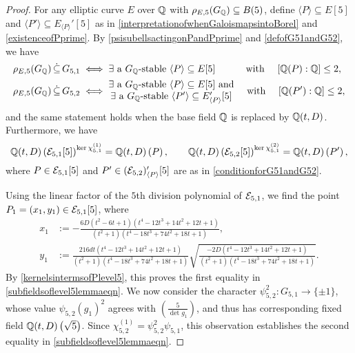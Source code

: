 \begin{proof}
For any elliptic curve $E$ over $\mathbb{Q}$ with $\rho_{E,5}(G_{\mathbb{Q}}) \subseteq B(5)$, define $\langle P \rangle \subseteq E[5]$ and $\langle P' \rangle \subseteq E_{\langle P \rangle}'[5]$ as in \eqref{interpretationofwhenGaloismapsintoBorel} and \eqref{existenceofPprime}.  By \eqref{psisubellsactingonPandPprime} and \eqref{defofG51andG52}, we have
\begin{equation} \label{conditionforG51andG52}
\begin{split}
\rho_{E,5}(G_{\mathbb{Q}}) \, \dot\subseteq \, G_{5,1} \; &\Longleftrightarrow \; \exists \text{ a $G_{\mathbb{Q}}$-stable } \langle P \rangle \subseteq E[5] \quad\quad\;\;\; \text{ with } \quad [ \mathbb{Q}( P ) : \mathbb{Q} ] \leq 2, \\
\rho_{E,5}(G_{\mathbb{Q}}) \, \dot\subseteq \, G_{5,2} \; &\Longleftrightarrow \; \begin{matrix} \exists \text{ a $G_{\mathbb{Q}}$-stable } \langle P \rangle \subseteq E[5] \text{ and} \\ \exists \text{ a $G_{\mathbb{Q}}$-stable  } \langle P' \rangle \subseteq E_{\langle P \rangle}' [5] \end{matrix} \quad \text{ with } \quad [ \mathbb{Q}( P' ) : \mathbb{Q} ] \leq 2,
\end{split}
\end{equation}
and the same statement holds when the base field $\mathbb{Q}$ is replaced by $\mathbb{Q}(t,D)$.  Furthermore, we have
\begin{equation} \label{kernelsintermsofPlevel5}
\mathbb{Q}(t,D)\left( \mathcal{E}_{5,1}[5] \right)^{\ker \chi_{5,1}^{(1)}} = \mathbb{Q}(t,D)\left( P \right), \quad\quad \mathbb{Q}(t,D)\left( \mathcal{E}_{5,2}[5] \right)^{\ker \chi_{5,1}^{(2)}} = \mathbb{Q}(t,D)\left( P' \right), 
\end{equation}
where $P \in \mathcal{E}_{5,1}[5]$ and $P' \in (\mathcal{E}_{5,2})_{\langle P \rangle}'[5]$ are as in \eqref{conditionforG51andG52}.

Using the linear factor of the $5$th division polynomial of $\mathcal{E}_{5,1}$, we find the point $P_1 = (x_1,y_1) \in \mathcal{E}_{5,1}[5]$, where
\[
\begin{split}
x_1 &:= -\frac{6D(t^2 - 6t + 1)(t^4 - 12t^3 + 14t^2 + 12t + 1)}{(t^2 + 1)(t^4 - 18t^3 + 74t^2 + 18t + 1)}, \\
y_1 &:=  \frac{216dt(t^4 - 12t^3 + 14t^2 + 12t + 1)}{(t^2 + 1)(t^4 - 18t^3 + 74t^2 + 18t + 1)} \sqrt{\frac{-2D(t^4 - 12t^3 + 14t^2 + 12t + 1)}{(t^2 + 1)(t^4 - 18t^3 + 74t^2 + 18t + 1)}}.
\end{split}
\]
By \eqref{kernelsintermsofPlevel5}, this proves the first equality in \eqref{subfieldsoflevel5lemmaeqn}. We now consider the character $\displaystyle \psi_{5,2}^2 : G_{5,1} \rightarrow \{ \pm 1 \}$, whose value $\psi_{5,2}(g_1)^2$ agrees with $\displaystyle \left( \frac{5}{\det g_1} \right)$, and thus has corresponding fixed field $\mathbb{Q}(t,D)\left( \sqrt{5} \right)$.  Since $\chi_{5,2}^{(1)} = \psi_{5,2}^2 \psi_{5,1}$, this observation establishes the second equality in \eqref{subfieldsoflevel5lemmaeqn}.  


\end{proof}
